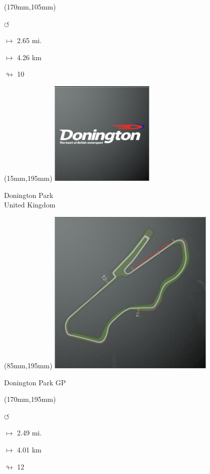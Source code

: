 \begin{textblock*}{30mm}(170mm,105mm)%
\par \Huge$\circlearrowleft$
\Large
\par$\mapsto$ 2.65 mi.
\par$\mapsto$ 4.26 km
\par$\looparrowright$ 10
\end{textblock*}
\begin{textblock*}{60mm}(15mm,195mm)%
\includegraphics[width=50mm]{LG/2015-05-20_00080.png}
\par Donington Park\\ United Kingdom
\end{textblock*}
\begin{textblock*}{80mm}(85mm,195mm)%
\includegraphics[width=80mm]{TR/2015-05-20_00022.png}
\centerline{Donington Park GP}
\end{textblock*}
\begin{textblock*}{30mm}(170mm,195mm)%
\par \Huge$\circlearrowleft$
\Large
\par$\mapsto$ 2.49 mi.
\par$\mapsto$ 4.01 km
\par$\looparrowright$ 12
\end{textblock*}
\null\newpage

